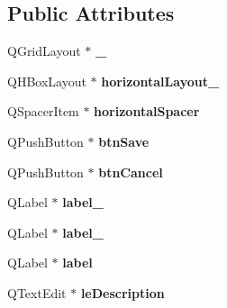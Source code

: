 \subsection*{Public Attributes}
\begin{DoxyCompactItemize}
\item 
\hypertarget{classUi__AddQuoteDialog_ac0b5eab952fe0ff58b3d8520865e7702}{Q\-Grid\-Layout $\ast$ {\bfseries \-\_}}\label{classUi__AddQuoteDialog_ac0b5eab952fe0ff58b3d8520865e7702}

\item 
\hypertarget{classUi__AddQuoteDialog_a4e7910fc0be8cfaffaceb48d63cb2cfe}{Q\-H\-Box\-Layout $\ast$ {\bfseries horizontal\-Layout\-\_}}\label{classUi__AddQuoteDialog_a4e7910fc0be8cfaffaceb48d63cb2cfe}

\item 
\hypertarget{classUi__AddQuoteDialog_a63eca59cf53e0fcb9e0ede7fa3aca8fa}{Q\-Spacer\-Item $\ast$ {\bfseries horizontal\-Spacer}}\label{classUi__AddQuoteDialog_a63eca59cf53e0fcb9e0ede7fa3aca8fa}

\item 
\hypertarget{classUi__AddQuoteDialog_a63dfe00e32d1b333625c56c9971be67e}{Q\-Push\-Button $\ast$ {\bfseries btn\-Save}}\label{classUi__AddQuoteDialog_a63dfe00e32d1b333625c56c9971be67e}

\item 
\hypertarget{classUi__AddQuoteDialog_af0002645c168feb45c65c3a5c6b9dcc1}{Q\-Push\-Button $\ast$ {\bfseries btn\-Cancel}}\label{classUi__AddQuoteDialog_af0002645c168feb45c65c3a5c6b9dcc1}

\item 
\hypertarget{classUi__AddQuoteDialog_a79255cff9c5f82f333a3a3661cb8c634}{Q\-Label $\ast$ {\bfseries label\-\_}}\label{classUi__AddQuoteDialog_a79255cff9c5f82f333a3a3661cb8c634}

\item 
\hypertarget{classUi__AddQuoteDialog_a6a6b70a3496fbe367032af890b2e112e}{Q\-Label $\ast$ {\bfseries label\-\_}}\label{classUi__AddQuoteDialog_a6a6b70a3496fbe367032af890b2e112e}

\item 
\hypertarget{classUi__AddQuoteDialog_a96af57b2fe7de5d151c56ff8aa9aefc4}{Q\-Label $\ast$ {\bfseries label}}\label{classUi__AddQuoteDialog_a96af57b2fe7de5d151c56ff8aa9aefc4}

\item 
\hypertarget{classUi__AddQuoteDialog_a831c06c9d86e19d296b00e2f4b52a6c1}{Q\-Text\-Edit $\ast$ {\bfseries le\-Description}}\label{classUi__AddQuoteDialog_a831c06c9d86e19d296b00e2f4b52a6c1}


\end{DoxyCompactItemize}
